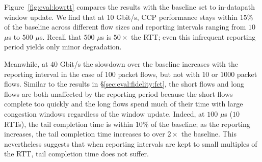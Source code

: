 Figure~\ref{fig:eval:lowrtt} compares the results with the baseline set to in-datapath window update. 
We find that at $10$ Gbit/s, CCP performance stays within $15$\% of the baseline across different flow sizes and reporting intervals ranging from $10$ $\mu$s to $500$ $\mu$s. 
Recall that $500$ $\mu$s is $50\times$ the RTT; even this infrequent reporting period yields only minor degradation.

Meanwhile, at $40$ Gbit/s the slowdown over the baseline increases with the reporting interval in the case of $100$ packet flows, but not with $10$ or $1000$ packet flows. 
Similar to the results in \S\ref{sec:eval:fidelity:fct}, the short flows and long flows are both unaffected by the reporting period because the short flows complete too quickly and the long flows spend much of their time with large congestion windows regardless of the window update.
Indeed, at $100$ $\mu$s ($10$ RTTs), the tail completion time is within $10$\% of the baseline; as the reporting increases, the tail completion time increases to over $2\times$ the baseline. 
This nevertheless suggests that when reporting intervals are kept to small multiples of the RTT, tail completion time does not suffer.
